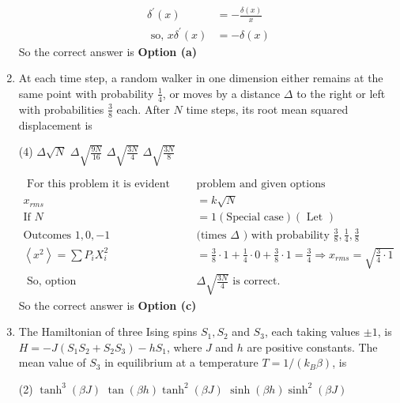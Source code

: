 \begin{enumerate}
\begin{answer}
\begin{align*}
	\delta^{\prime}(x)&=-\frac{\delta(x)}{x} \\
	\text { so, } x \delta^{\prime}(x)&=-\delta(x)
	\end{align*}
		So the correct answer is \textbf{Option (a)}
\end{answer}
\item At each time step, a random walker in one dimension either remains at the same point with probability $\frac{1}{4}$, or moves by a distance $\Delta$ to the right or left with probabilities $\frac{3}{8}$ each. After $N$ time steps, its root mean squared displacement is
 \begin{tasks}(4)
	\task[\textbf{a.}]$\Delta \sqrt{N}$
	\task[\textbf{b.}] $\Delta \sqrt{\frac{9 N}{16}}$
	\task[\textbf{c.}]$\Delta \sqrt{\frac{3 N}{4}}$
	\task[\textbf{d.}] $\Delta \sqrt{\frac{3 N}{8}}$
\end{tasks}
\begin{answer}
	\begin{align*}
	\text { For this problem it is evident from }&\text{problem and given options }\\
	x_{r m s}&=k \sqrt{N}\\
	\text{If }N&=1( \text{Special case}) (\text{ Let })\\
\text{Outcomes $1,0,-1$}&
\text{(times $\Delta$ ) with probability $\frac{3}{8}, \frac{1}{4}, \frac{3}{8}$}\\
	\left\langle x^{2}\right\rangle=\sum P_{i} X_{i}^{2}&=\frac{3}{8} \cdot 1+\frac{1}{4} \cdot 0+\frac{3}{8} \cdot 1=\frac{3}{4} \Rightarrow x_{r m s}=\sqrt{\frac{3}{4} \cdot 1}\\
	\text { So, option } &\Delta \sqrt{\frac{3 N}{4}} \text { is correct. }
	\end{align*}
		So the correct answer is \textbf{Option (c)}
\end{answer}
\item The Hamiltonian of three Ising spins $S_{1}, S_{2}$ and $S_{3}$, each taking values $\pm 1$, is $H=-J\left(S_{1} S_{2}+S_{2} S_{3}\right)-h S_{1}$, where $J$ and $h$ are positive constants. The mean value of $S_{3}$ in equilibrium at a temperature $T=1 /\left(k_{B} \beta\right)$, is
 \begin{tasks}(2)
	\task[\textbf{a.}]$\tanh ^{3}(\beta J)$
	\task[\textbf{b.}]$\tan (\beta h) \tanh ^{2}(\beta J)$
	\task[\textbf{c.}]$\sinh (\beta h) \sinh ^{2}(\beta J)$
\end{tasks}
\begin{answer}
	\begin{align*}

\end{align*}
\end{answer}
\end{enumerate}
